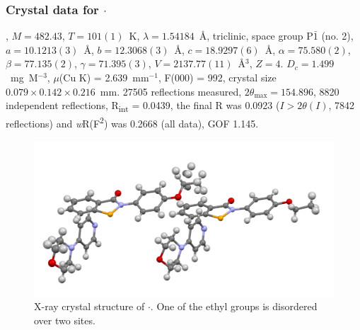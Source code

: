 \begin{refsection}
\subsubsection{Crystal data for \texorpdfstring{$\cdot$}{C24 H25 N3 O3 Se}}
, $M=482.43$, $T=101(1)$~K, $\lambda=1.54184$~\AA, triclinic, space group P$\bar{1}$ (no. 2), $a = 10.1213(3)$~\AA, $b = 12.3068(3)$~\AA, $c = 18.9297(6)$~\AA, $\alpha = 75.580(2)$\degree, $\beta = 77.135(2)$\degree, $\gamma = 71.395(3)$\degree, $V = 2137.77(11)$~\AA$^{3}$, $Z = 4$. $D_{c}= 1.499$~mg~M$^{-3}$, $\mu$(Cu K\a) = 2.639~mm$^{-1}$, F(000) = 992, crystal size $0.079 \times 0.142 \times 0.216$~mm. 27505 reflections measured, $2\theta_{\mathrm{max}}=154.896$\degree, 8820 independent reflections, R\textsubscript{int} = 0.0439, the final R was 0.0923 ($I > 2\theta(I)$, 7842 reflections) and \emph{w}R(F\textsuperscript{2}) was 0.2668 (all data), GOF 1.145.

\begin{figure}
  \includegraphics[width=0.6\linewidth]{Figures/ebs-4oet-morph-xtal.pdf}
  \caption[X-ray crystal structure of \texorpdfstring{$\cdot$}{C24 H25 N3 O3 Se}.]{X-ray crystal structure of \texorpdfstring{$\cdot$}{C24 H25 N3 O3 Se}. One of the ethyl groups is disordered over two sites.}
\end{figure}

\printbibliography[heading=subbibliography]
\end{refsection}
